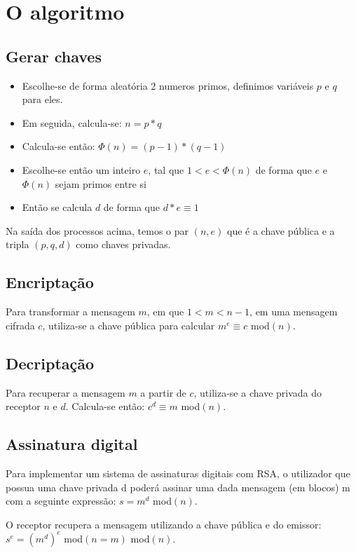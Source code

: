 \documentclass[12pt, a4paper]{article}
\begin{document}
\restoregeometry %
\nopagecolor%

\section{O algoritmo}
\subsection{Gerar chaves}
\begin{itemize}
    \item Escolhe-se de forma aleatória 2 numeros primos, definimos variáveis $p$ e $q$ para eles.
    \item Em seguida, calcula-se: $n = p * q$
    \item Calcula-se então: $\Phi(n) = (p - 1) * (q - 1)$
    \item Escolhe-se então um inteiro $e$, tal que $1 < e < \Phi(n)$ de forma que $e$ e $\Phi(n)$ sejam primos entre si
    \item Então se calcula $d$ de forma que $d * e \equiv 1$
\end{itemize}

Na saída dos processos acima, temos o par $(n, e)$ que é a chave pública e a tripla $(p, q, d)$ como chaves privadas.

\subsection{Encriptação}
Para transformar a mensagem $m$, em que $1 < m < n - 1$, em uma mensagem cifrada $c$, utiliza-se a chave pública para calcular $m^{e} \equiv c$ mod$(n)$.

\subsection{Decriptação}
Para recuperar a mensagem $m$ a partir de $c$, utiliza-se a chave privada do receptor $n$ e $d$. Calcula-se então: $c^{d} \equiv m$ mod$(n)$.

\subsection{Assinatura digital}
Para implementar um sistema de assinaturas digitais com RSA, o utilizador que possua uma chave privada d poderá assinar uma dada mensagem (em blocos) m com a seguinte expressão: $s = m^{d}$ mod$(n)$.

O receptor recupera a mensagem utilizando a chave pública e do emissor: $s^{e} = (m^{d})^{e}$ mod$(n = m)$ mod$(n)$.
\end{document}
